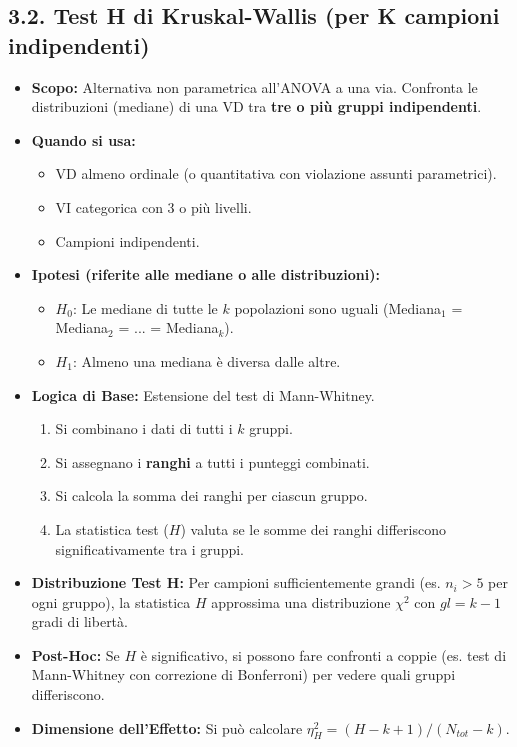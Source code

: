 \documentclass[12pt, a4paper]{article}
\newcommand{\chisq}{\chi^2} %
\newcommand{\Hnull}{H_0} %
\newcommand{\Halt}{H_1} %
\newcommand{\df}{gl} %
\newcommand{\Hkruskal}{H} %
\begin{document}
\subsection*{3.2. Test H di Kruskal-Wallis (per K campioni indipendenti)}
\begin{itemize}
    \item \textbf{Scopo:} Alternativa non parametrica all'ANOVA a una via. Confronta le distribuzioni (mediane) di una VD tra \textbf{tre o più gruppi indipendenti}.
    \item \textbf{Quando si usa:}
        \begin{itemize}
            \item VD almeno ordinale (o quantitativa con violazione assunti parametrici).
            \item VI categorica con 3 o più livelli.
            \item Campioni indipendenti.
        \end{itemize}
    \item \textbf{Ipotesi (riferite alle mediane o alle distribuzioni):}
        \begin{itemize}
            \item $\Hnull$: Le mediane di tutte le $k$ popolazioni sono uguali (Mediana$_1$ = Mediana$_2$ = ... = Mediana$_k$).
            \item $\Halt$: Almeno una mediana è diversa dalle altre.
        \end{itemize}
    \item \textbf{Logica di Base:} Estensione del test di Mann-Whitney.
        \begin{enumerate}
            \item Si combinano i dati di tutti i $k$ gruppi.
            \item Si assegnano i \textbf{ranghi} a tutti i punteggi combinati.
            \item Si calcola la somma dei ranghi per ciascun gruppo.
            \item La statistica test ($\Hkruskal$) valuta se le somme dei ranghi differiscono significativamente tra i gruppi.
        \end{enumerate}
    \item \textbf{Distribuzione Test H:} Per campioni sufficientemente grandi (es. $n_i > 5$ per ogni gruppo), la statistica $\Hkruskal$ approssima una distribuzione $\chisq$ con $\df = k-1$ gradi di libertà.
    \item \textbf{Post-Hoc:} Se $\Hkruskal$ è significativo, si possono fare confronti a coppie (es. test di Mann-Whitney con correzione di Bonferroni) per vedere quali gruppi differiscono.
    \item \textbf{Dimensione dell'Effetto:} Si può calcolare $\eta^2_H = (\Hkruskal - k + 1) / (N_{tot} - k)$.
\end{itemize}
\end{document}
